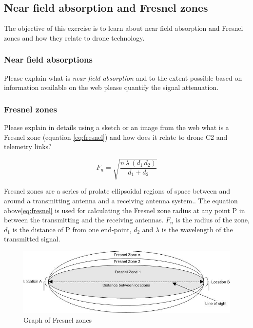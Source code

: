\documentclass[paper=letter, fontsize=10pt]{article}
\begin{document}
\subsection{Near field absorption and Fresnel zones}
The objective of this exercise is to learn about near field absorption and Fresnel zones and how they relate to drone technology.


\subsubsection{Near field absorptions}
Please explain what is \textit{near field absorption} and to the extent possible based on information available on the web please quantify the signal attenuation.



\subsubsection{Fresnel zones}
Please explain in details using a sketch or an image from the web what is a Fresnel zone (equation \ref{eq:fresnel}) and how does it relate to drone C2 and telemetry links?


\begin{equation}
F_n = \sqrt{\frac{n\, \lambda \, (d_1\, d_2)}{d_1 + d_2}}
\label{eq:fresnel}
\end{equation}

Fresnel zones are a series of prolate ellipsoidal regions of space between and around a transmitting antenna and a receiving antenna system.\cite{wikipedia_fresnel}. The equation above\ref{eq:fresnel} is used for calculating the Fresnel zone radius at any point P in between the transmitting and the receiving antennas. \textit{$F_n$} is the radius of the zone, \textit{$d_1$} is the distance of P from one end-point, \textit{$d_2$} and $\lambda$ is the wavelength of the transmitted signal.

\begin{figure}[h!]
\centering
\includegraphics[scale=1.5]{Figures/Fresnel_zones}
\caption{Graph of Fresnel zones}
\label{fig:fresnel_zones}
\end{figure}
\end{document}
